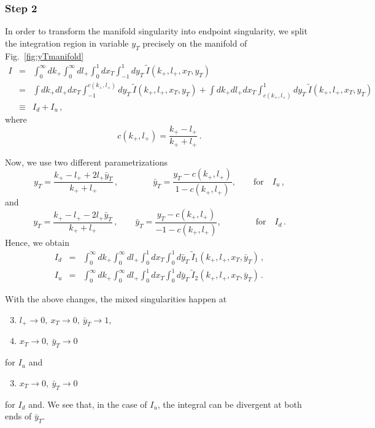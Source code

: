 \documentclass[a4paper,11pt]{report}
\numberwithin{equation}{section}
\newcommand{\kp}{k_+}
\newcommand{\lp}{l_+}
\begin{document}
\subsubsection*{Step 2}

In order to transform the manifold singularity into endpoint singularity, we
split the integration region in variable $y_T$ precisely on the manifold of
Fig.~\ref{fig:yTmanifold}
%
\begin{eqnarray}
  I & =  & 
  \int_0^\infty\!\!\! d\kp
  \int_0^\infty\!\!\! d\lp
  \int_0^1\!\!\! d x_T
  \int_{-1}^1\!\!\! d y_T\
  \tilde I(\kp, \lp, x_T, y_T)
  \nonumber \\
  & = &
  \int  d\kp d\lp d x_T
  \int_{-1}^{c(\kp, \lp)}\!\!\! d y_T\
  \tilde I(\kp, \lp, x_T, y_T)
  +
  \int  d\kp d\lp d x_T
  \int_{c(\kp, \lp)}^{1}\!\!\! d y_T\
  \tilde I(\kp, \lp, x_T, y_T)
  \nonumber \\
  & \equiv &
  I_d + I_u\,,
\end{eqnarray}
%
where
%
\begin{equation}
  c(\kp, \lp) = \frac{\kp-\lp}{\kp+\lp}\,.
\end{equation}

Now, we use two different parametrizations
%
\begin{equation}
  y_T = \frac{\kp-\lp + 2 \lp \bar y_T}{\kp+\lp}\,,
  \qquad \qquad
  \bar y_T = \frac{y_T-c(\kp,\lp)}{1-c(\kp,\lp)},
  \qquad 
  \text{for}\quad I_u\,,
\end{equation}
%
and
%
\begin{equation}
  y_T = \frac{\kp-\lp - 2 \lp \bar y_T}{\kp+\lp}\,,
  \qquad
  \bar y_T = \frac{y_T-c(\kp,\lp)}{-1-c(\kp,\lp)},
  \qquad \qquad
  \text{for}\quad I_d\,.
\end{equation}
%
Hence, we obtain
%
\begin{eqnarray}
 I_d  & =  &
  \int_0^\infty\!\!\! d\kp
  \int_0^\infty\!\!\! d\lp
  \int_0^1\!\!\! d x_T
  \int_{0}^1\!\!\! d \bar y_T\
  \tilde I_1(\kp, \lp, x_T, \bar y_T)\,,
  \\
 I_u  & =  &
  \int_0^\infty\!\!\! d\kp
  \int_0^\infty\!\!\! d\lp
  \int_0^1\!\!\! d x_T
  \int_{0}^1\!\!\! d \bar y_T\
  \tilde I_2(\kp, \lp, x_T, \bar y_T)\,.
\end{eqnarray}

With the above changes, the mixed singularities happen at
%
\begin{enumerate}
  \setcounter{enumi}{2}
  \item
    $l_+ \to 0,\ x_T \to 0,\ \bar y_T \to 1$,
  \item
    $x_T \to 0,\ \bar y_T \to 0$
\end{enumerate}
%
for $I_u$ and
%
\begin{enumerate}
  \setcounter{enumi}{2}
  \item
    $x_T \to 0,\ \bar y_T \to 0$
\end{enumerate}
%
for $I_d$ and.
%
We see that, in the case of $I_u$, the integral can be divergent at both ends of
$\bar y_T$.
\end{document}
